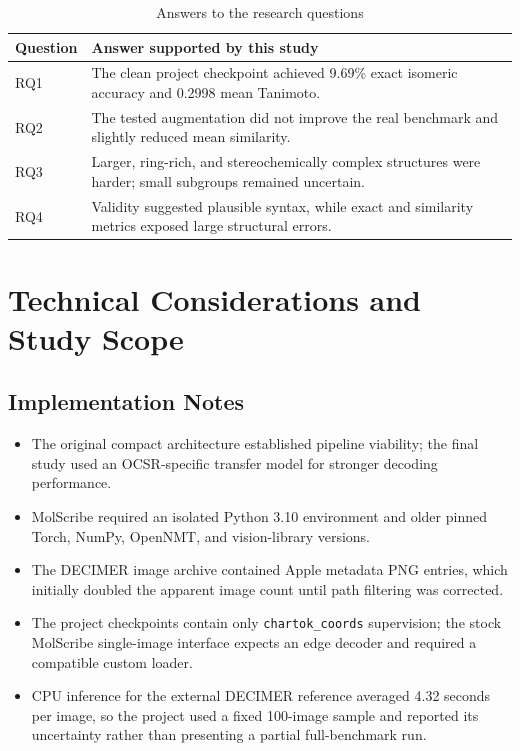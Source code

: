 \documentclass[11pt,a4paper]{article}
\begin{document}
\begin{table}[H]
\centering
\caption{Answers to the research questions}
\begin{tabularx}{\textwidth}{C{1.3cm}Y}
\toprule
\textbf{Question} & \textbf{Answer supported by this study} \\
\midrule
RQ1 & The clean project checkpoint achieved 9.69\% exact isomeric accuracy and 0.2998 mean Tanimoto. \\
RQ2 & The tested augmentation did not improve the real benchmark and slightly reduced mean similarity. \\
RQ3 & Larger, ring-rich, and stereochemically complex structures were harder; small subgroups remained uncertain. \\
RQ4 & Validity suggested plausible syntax, while exact and similarity metrics exposed large structural errors. \\
\bottomrule
\end{tabularx}
\end{table}

\section*{Technical Considerations and Study Scope}

\subsection*{Implementation Notes}

\begin{itemize}
  \item The original compact architecture established pipeline viability; the final study used an OCSR-specific transfer model for stronger decoding performance.
  \item MolScribe required an isolated Python 3.10 environment and older pinned Torch, NumPy, OpenNMT, and vision-library versions.
  \item The DECIMER image archive contained Apple metadata PNG entries, which initially doubled the apparent image count until path filtering was corrected.
  \item The project checkpoints contain only \texttt{chartok\_coords} supervision; the stock MolScribe single-image interface expects an edge decoder and required a compatible custom loader.
  \item CPU inference for the external DECIMER reference averaged 4.32 seconds per image, so the project used a fixed 100-image sample and reported its uncertainty rather than presenting a partial full-benchmark run.
\end{itemize}
\end{document}
